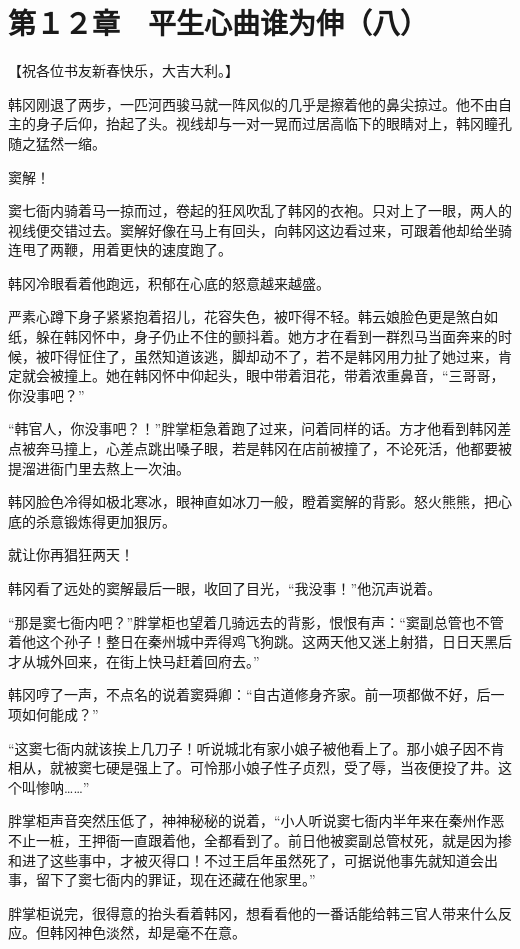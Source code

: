 \section{第１２章　平生心曲谁为伸（八）}

【祝各位书友新春快乐，大吉大利。】

韩冈刚退了两步，一匹河西骏马就一阵风似的几乎是擦着他的鼻尖掠过。他不由自主的身子后仰，抬起了头。视线却与一对一晃而过居高临下的眼睛对上，韩冈瞳孔随之猛然一缩。

窦解！

窦七衙内骑着马一掠而过，卷起的狂风吹乱了韩冈的衣袍。只对上了一眼，两人的视线便交错过去。窦解好像在马上有回头，向韩冈这边看过来，可跟着他却给坐骑连甩了两鞭，用着更快的速度跑了。

韩冈冷眼看着他跑远，积郁在心底的怒意越来越盛。

严素心蹲下身子紧紧抱着招儿，花容失色，被吓得不轻。韩云娘脸色更是煞白如纸，躲在韩冈怀中，身子仍止不住的颤抖着。她方才在看到一群烈马当面奔来的时候，被吓得怔住了，虽然知道该逃，脚却动不了，若不是韩冈用力扯了她过来，肯定就会被撞上。她在韩冈怀中仰起头，眼中带着泪花，带着浓重鼻音，“三哥哥，你没事吧？”

“韩官人，你没事吧？！”胖掌柜急着跑了过来，问着同样的话。方才他看到韩冈差点被奔马撞上，心差点跳出嗓子眼，若是韩冈在店前被撞了，不论死活，他都要被提溜进衙门里去熬上一次油。

韩冈脸色冷得如极北寒冰，眼神直如冰刀一般，瞪着窦解的背影。怒火熊熊，把心底的杀意锻炼得更加狠厉。

就让你再猖狂两天！

韩冈看了远处的窦解最后一眼，收回了目光，“我没事！”他沉声说着。

“那是窦七衙内吧？”胖掌柜也望着几骑远去的背影，恨恨有声：“窦副总管也不管着他这个孙子！整日在秦州城中弄得鸡飞狗跳。这两天他又迷上射猎，日日天黑后才从城外回来，在街上快马赶着回府去。”

韩冈哼了一声，不点名的说着窦舜卿：“自古道修身齐家。前一项都做不好，后一项如何能成？”

“这窦七衙内就该挨上几刀子！听说城北有家小娘子被他看上了。那小娘子因不肯相从，就被窦七硬是强上了。可怜那小娘子性子贞烈，受了辱，当夜便投了井。这个叫惨呐……”

胖掌柜声音突然压低了，神神秘秘的说着，“小人听说窦七衙内半年来在秦州作恶不止一桩，王押衙一直跟着他，全都看到了。前日他被窦副总管杖死，就是因为掺和进了这些事中，才被灭得口！不过王启年虽然死了，可据说他事先就知道会出事，留下了窦七衙内的罪证，现在还藏在他家里。”

胖掌柜说完，很得意的抬头看着韩冈，想看看他的一番话能给韩三官人带来什么反应。但韩冈神色淡然，却是毫不在意。

